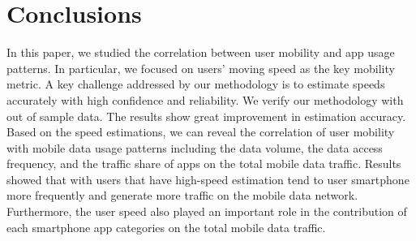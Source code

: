 \section{Conclusions}\label{conclusion}

In this paper, we studied the correlation between user mobility and app usage patterns.
In particular, we focused on users' moving speed as the key mobility metric. 
A key challenge addressed by our methodology is to estimate speeds accurately with high confidence and reliability. 
We verify our methodology with out of sample data. The results show great improvement in estimation accuracy.
Based on the speed estimations, we can reveal the correlation of user mobility with mobile data usage patterns 
including the data volume, the data access frequency, and the traffic share of apps on the total mobile data traffic. 
Results showed that with users that have high-speed estimation tend to user smartphone more frequently and 
generate more traffic on the mobile data network. 
Furthermore, the user speed also played an important role in the contribution of each smartphone app categories on the total mobile data traffic. 
